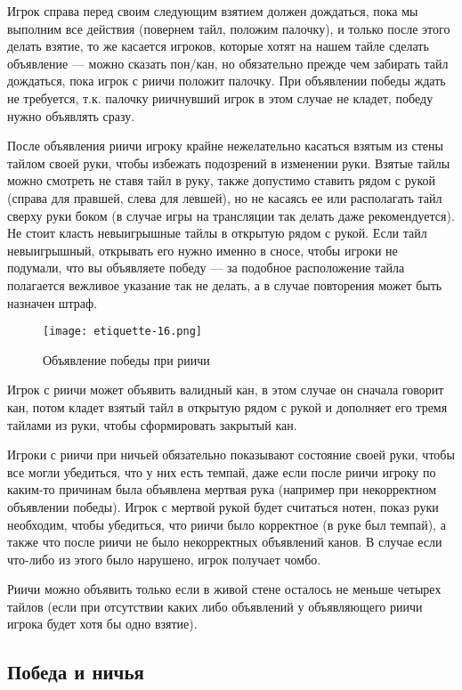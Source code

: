 Игрок справа перед своим следующим взятием должен дождаться, пока мы выполним все действия (повернем тайл, положим палочку), и только после этого делать взятие, то же касается игроков, которые хотят на нашем тайле сделать объявление --- можно сказать пон/кан, но обязательно прежде чем забирать тайл дождаться, пока игрок с риичи положит палочку. При объявлении победы ждать не требуется, т.к. палочку риичнувший игрок в этом случае не кладет, победу нужно объявлять сразу.

После объявления риичи игроку крайне нежелательно касаться взятым из стены тайлом своей руки, чтобы избежать подозрений в изменении руки. Взятые тайлы можно смотреть не ставя тайл в руку, также допустимо ставить рядом с рукой (справа для правшей, слева для левшей), но не касаясь ее или располагать тайл сверху руки боком (в случае игры на трансляции так делать даже рекомендуется). Не стоит класть невыигрышные тайлы в открытую рядом с рукой. Если тайл невыигрышный, открывать его нужно именно в сносе, чтобы игроки не подумали, что вы объявляете победу --- за подобное расположение тайла полагается вежливое указание так не делать, а в случае повторения может быть назначен штраф.

\begin{figure}[H]
	\centering
	\texttt{[image: etiquette-16.png]}
	\caption{Объявление победы при риичи}
\end{figure}

Игрок с риичи может объявить валидный кан, в этом случае он сначала говорит кан, потом кладет взятый тайл в открытую рядом с рукой и дополняет его тремя тайлами из руки, чтобы сформировать закрытый кан.

Игроки с риичи при ничьей обязательно показывают состояние своей руки, чтобы все могли убедиться, что у них есть темпай, даже если после риичи игроку по каким-то причинам была объявлена мертвая рука (например при некорректном объявлении победы). Игрок с мертвой рукой будет считаться нотен, показ руки необходим, чтобы убедиться, что риичи было корректное (в руке был темпай), а также что после риичи не было некорректных объявлений канов. В случае если что-либо из этого было нарушено, игрок получает чомбо.

Риичи можно объявить только если в живой стене осталось не меньше четырех тайлов (если при отсутствии каких либо объявлений у объявляющего риичи игрока будет хотя бы одно взятие). 

\subsection{Победа и ничья}


